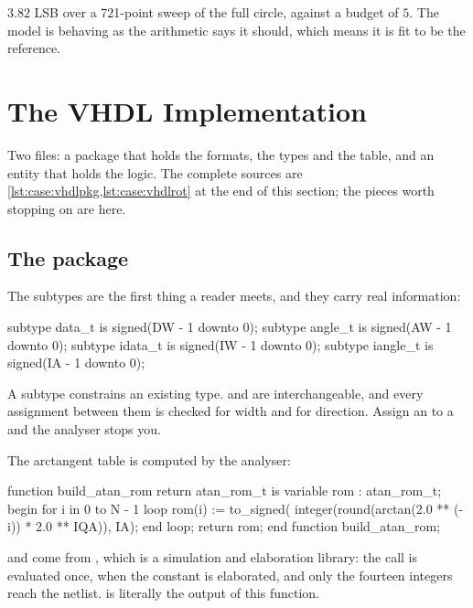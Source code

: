 $3.82$ LSB over a 721-point sweep of the full circle, against a budget of
$5$. The model is behaving as the arithmetic says it should, which means it
is fit to be the reference.

\clearpage
{}

\section{The VHDL Implementation}
\label{sec:case:vhdl}

Two files: a package that holds the formats, the types and the table, and an
entity that holds the logic. The complete sources are
\cref{lst:case:vhdlpkg,lst:case:vhdlrot} at the end of this section; the
pieces worth stopping on are here.

\subsection{The package}

The subtypes are the first thing a reader meets, and they carry real
information:

\begin{vhdlcode}
subtype data_t   is signed(DW - 1 downto 0);
subtype angle_t  is signed(AW - 1 downto 0);
subtype idata_t  is signed(IW - 1 downto 0);
subtype iangle_t is signed(IA - 1 downto 0);
\end{vhdlcode}

A subtype constrains an existing type.  and
 are interchangeable, and every assignment between
them is checked for width and for direction. Assign an  to a
 and the analyser stops you.

The arctangent table is computed by the analyser:

\begin{vhdlcode}
function build_atan_rom return atan_rom_t is
  variable rom : atan_rom_t;
begin
  for i in 0 to N - 1 loop
    rom(i) := to_signed(
                integer(round(arctan(2.0 ** (-i)) * 2.0 ** IQA)), IA);
  end loop;
  return rom;
end function build_atan_rom;
\end{vhdlcode}

 and  come from , which is a
simulation and elaboration library: the call is evaluated once, when the
constant is elaborated, and only the fourteen integers reach the netlist.
 is literally the output of this function.

